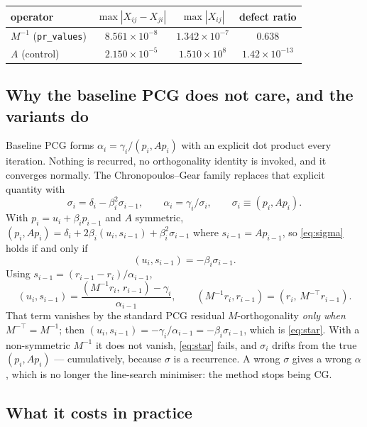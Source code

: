 \documentclass[11pt,a4paper]{article}
\newcommand{\Mi}{M^{-1}}
\begin{document}
\begin{center}
\begin{tabular}{@{}lccc@{}}
\toprule
operator & $\max|X_{ij}-X_{ji}|$ & $\max|X_{ij}|$ & defect ratio\\
\midrule
$\Mi$ (\texttt{pr\_values}) & $8.561\times10^{-8}$ & $1.342\times10^{-7}$ & $\mathbf{0.638}$\\
$A$ (control)               & $2.150\times10^{-5}$ & $1.510\times10^{8}$  & $1.42\times10^{-13}$\\
\bottomrule
\end{tabular}
\end{center}

\subsection{Why the baseline PCG does not care, and the variants do}

Baseline PCG forms $\alpha_i=\gamma_i/(p_i,Ap_i)$ with an explicit dot product every
iteration. Nothing is recurred, no orthogonality identity is invoked, and it converges
normally. The Chronopoulos--Gear family replaces that explicit quantity with
\begin{equation}
  \sigma_i=\delta_i-\beta_i^2\sigma_{i-1},\qquad \alpha_i=\gamma_i/\sigma_i,
  \qquad \sigma_i\equiv(p_i,Ap_i).
  \label{eq:sigma}
\end{equation}
With $p_i=u_i+\beta_i p_{i-1}$ and $A$ symmetric,
$(p_i,Ap_i)=\delta_i+2\beta_i(u_i,s_{i-1})+\beta_i^2\sigma_{i-1}$ where
$s_{i-1}=Ap_{i-1}$, so \eqref{eq:sigma} holds if and only if
\begin{equation}
  (u_i,s_{i-1}) = -\beta_i\sigma_{i-1}.
  \label{eq:star}
\end{equation}
Using $s_{i-1}=(r_{i-1}-r_i)/\alpha_{i-1}$,
\begin{equation}
  (u_i,s_{i-1})=\frac{(\Mi r_i,\,r_{i-1})-\gamma_i}{\alpha_{i-1}},
  \qquad
  (\Mi r_i,r_{i-1}) = (r_i,\,M^{-\top}r_{i-1}).
\end{equation}
That term vanishes by the standard PCG residual $M$-orthogonality \emph{only when}
$M^{-\top}=\Mi$; then $(u_i,s_{i-1})=-\gamma_i/\alpha_{i-1}=-\beta_i\sigma_{i-1}$,
which is \eqref{eq:star}. With a non-symmetric $\Mi$ it does not vanish,
\eqref{eq:star} fails, and $\sigma_i$ drifts from the true $(p_i,Ap_i)$ --- cumulatively,
because $\sigma$ is a recurrence. A wrong $\sigma$ gives a wrong $\alpha$, which is no
longer the line-search minimiser: the method stops being CG.

\subsection{What it costs in practice}
\end{document}
